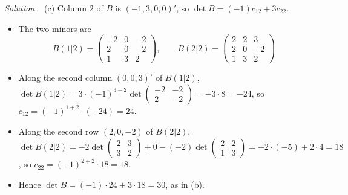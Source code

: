 \documentclass[12pt]{article}
\theoremstyle{definition}
\newenvironment{solution}{\par\noindent\textit{Solution.}\ }{\par\smallskip}
\begin{document}
\begin{solution}
(c) Column \(2\) of \(B\) is \((-1,3,0,0)'\), so \(\det B=(-1)c_{12}+3c_{22}\).
\begin{itemize}
\item The two minors are
\[
B(1|2)=\begin{pmatrix}-2&0&-2\\2&0&-2\\1&3&2\end{pmatrix},\qquad B(2|2)=\begin{pmatrix}2&2&3\\2&0&-2\\1&3&2\end{pmatrix}
\]
\item Along the second column \((0,0,3)'\) of \(B(1|2)\),
\(\det B(1|2)=3\cdot(-1)^{3+2}\det\left(\begin{smallmatrix}-2&-2\\2&-2\end{smallmatrix}\right)=-3\cdot8=-24\),
so \(c_{12}=(-1)^{1+2}\cdot(-24)=24\).
\item Along the second row \((2,0,-2)\) of \(B(2|2)\),
\(\det B(2|2)=-2\det\left(\begin{smallmatrix}2&3\\3&2\end{smallmatrix}\right)+0-(-2)\det\left(\begin{smallmatrix}2&2\\1&3\end{smallmatrix}\right)
=-2\cdot(-5)+2\cdot4=18\), so \(c_{22}=(-1)^{2+2}\cdot18=18\).
\item Hence \(\det B=(-1)\cdot24+3\cdot18=30\), as in (b).
\end{itemize}
\end{solution}
\end{document}

